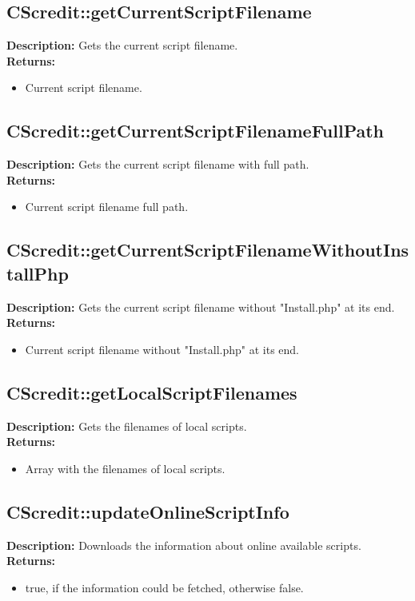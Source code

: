 \subsection{CScredit::getCurrentScriptFilename}
\textbf{Description:} Gets the current script filename.\\
\textbf{Returns:}
\begin{itemize}
\item Current script filename.
\end{itemize}

\subsection{CScredit::getCurrentScriptFilenameFullPath}
\textbf{Description:} Gets the current script filename with full path.\\
\textbf{Returns:}
\begin{itemize}
\item Current script filename full path.
\end{itemize}

\subsection{CScredit::getCurrentScriptFilenameWithoutInstallPhp}
\textbf{Description:} Gets the current script filename without "Install.php" at its end.\\
\textbf{Returns:}
\begin{itemize}
\item Current script filename without "Install.php" at its end.
\end{itemize}

\subsection{CScredit::getLocalScriptFilenames}
\textbf{Description:} Gets the filenames of local scripts.\\
\textbf{Returns:}
\begin{itemize}
\item Array with the filenames of local scripts.
\end{itemize}

\subsection{CScredit::updateOnlineScriptInfo}
\textbf{Description:} Downloads the information about online available scripts.\\
\textbf{Returns:}
\begin{itemize}
\item true, if the information could be fetched, otherwise false.
\end{itemize}

